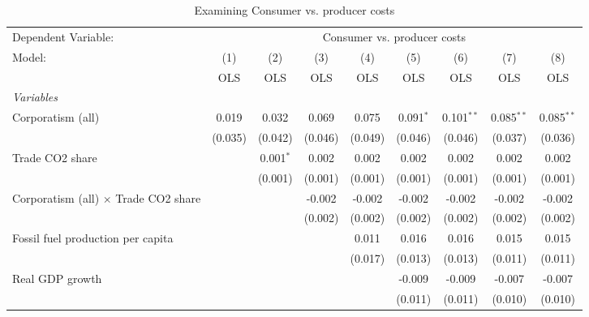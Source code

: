 
\begin{table}[htbp]
   \caption{Examining Consumer vs. producer costs}
   \centering
   \begin{tabular}{lcccccccc}
      \toprule
      Dependent Variable: & \multicolumn{8}{c}{Consumer vs. producer costs}\\
      Model:                                      & (1)     & (2)         & (3)     & (4)     & (5)         & (6)          & (7)          & (8)\\  
                                                  &  OLS    & OLS         & OLS     & OLS     & OLS         & OLS          & OLS          & OLS\\  
      \midrule
      \emph{Variables}\\
      Corporatism (all)                           & 0.019   & 0.032       & 0.069   & 0.075   & 0.091$^{*}$ & 0.101$^{**}$ & 0.085$^{**}$ & 0.085$^{**}$\\   
                                                  & (0.035) & (0.042)     & (0.046) & (0.049) & (0.046)     & (0.046)      & (0.037)      & (0.036)\\   
      Trade CO2 share                             &         & 0.001$^{*}$ & 0.002   & 0.002   & 0.002       & 0.002        & 0.002        & 0.002\\   
                                                  &         & (0.001)     & (0.001) & (0.001) & (0.001)     & (0.001)      & (0.001)      & (0.001)\\   
      Corporatism (all) $\times$ Trade CO2 share  &         &             & -0.002  & -0.002  & -0.002      & -0.002       & -0.002       & -0.002\\   
                                                  &         &             & (0.002) & (0.002) & (0.002)     & (0.002)      & (0.002)      & (0.002)\\   
      Fossil fuel production per capita           &         &             &         & 0.011   & 0.016       & 0.016        & 0.015        & 0.015\\   
                                                  &         &             &         & (0.017) & (0.013)     & (0.013)      & (0.011)      & (0.011)\\   
      Real GDP growth                             &         &             &         &         & -0.009      & -0.009       & -0.007       & -0.007\\   
                                                  &         &             &         &         & (0.011)     & (0.011)      & (0.010)      & (0.010)\\   

\end{tabular}
\end{table}
